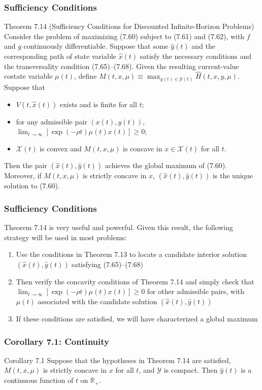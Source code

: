 \documentclass[9pt,aspectratio=169]{beamer}
\newcommand{\X}{\mathcal{X}}
\newcommand{\Y}{\mathcal{Y}}
\begin{document}
\begin{frame}
\frametitle{Sufficiency Conditions}
\begin{block}{Theorem 7.14 (Sufficiency Conditions for Discounted
      Infinite-Horizon Problems)}
    Consider the problem of maximizing (7.60) subject to (7.61) and (7.62),
    with $f$ and $g$ continuously differentiable. Suppose that some
    $\hat{y}(t)$ and the corresponding path of state variable $\hat{x}(t)$
    satisfy the necessary conditions and the transversality condition
    (7.65)--(7.68). Given the resulting current-value costate variable
    $\mu(t)$, define $M(t, x, \mu) \equiv \max_{y(t)\in \Y(t)} \hat{H}(t, x,
    y, \mu)$. Suppose that
    \begin{itemize}
        \item $V(t, \hat{x}(t))$ exists and is finite for all $t$;
        \item for any admissible pair $(x(t), y(t))$,
        $\lim_{t\to\infty}[\exp(-\rho t)\mu(t)x(t)] \geq 0$;
        \item $\X(t)$ is convex and $M(t, x, \mu)$ is concave in $x \in
        \X(t)$ for all $t$.
    \end{itemize}
    Then the pair $(\hat{x}(t), \hat{y}(t))$ achieves the global maximum of
    (7.60). Moreover, if $M(t, x, \mu)$ is strictly concave in $x$,
    $(\hat{x}(t), \hat{y}(t))$ is the unique solution to (7.60).
\end{block}

\end{frame}
\begin{frame}
\frametitle{Sufficiency Conditions}

Theorem 7.14 is very useful and powerful. Given this result, the following
strategy will be used in most problems:
\begin{enumerate}
    \item Use the conditions in Theorem 7.13 to locate a candidate interior
    solution $(\hat{x}(t), \hat{y}(t))$ satisfying (7.65)--(7.68)
    \item Then verify the concavity conditions of Theorem 7.14 and simply
    check that $\lim_{t\to\infty}[\exp(-\rho t)\mu(t)x(t)] \geq 0$ for other
    admissible pairs, with $\mu(t)$ associated with the candidate solution
    $(\hat{x}(t), \hat{y}(t))$
    \item If these conditions are satisfied, we will have characterized a
    global maximum
\end{enumerate}
\end{frame}

\begin{frame}
\frametitle{Corollary 7.1: Continuity}
\begin{block}{Corollary 7.1}
    Suppose that the hypotheses in Theorem 7.14 are satisfied, $M(t, x, \mu)$
    is strictly concave in $x$ for all $t$, and $\Y$ is compact. Then
    $\hat{y}(t)$ is a continuous function of $t$ on $\mathbb{R}_+$.
\end{block}
\end{frame}
\end{document}
